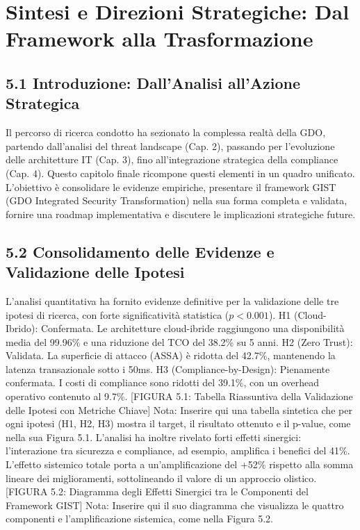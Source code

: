 \chapter{Sintesi e Direzioni Strategiche: Dal Framework alla Trasformazione}
\section{5.1 Introduzione: Dall'Analisi all'Azione Strategica}

Il percorso di ricerca condotto ha sezionato la complessa realtà della GDO, partendo dall'analisi del threat landscape (Cap. 2), passando per l'evoluzione delle architetture IT (Cap. 3), fino all'integrazione strategica della compliance (Cap. 4). Questo capitolo finale ricompone questi elementi in un quadro unificato. L'obiettivo è consolidare le evidenze empiriche, presentare il framework GIST (GDO Integrated Security Transformation) nella sua forma completa e validata, fornire una roadmap implementativa e discutere le implicazioni strategiche future.

\section{5.2 Consolidamento delle Evidenze e Validazione delle Ipotesi}

L'analisi quantitativa ha fornito evidenze definitive per la validazione delle tre ipotesi di ricerca, con forte significatività statistica ($p<0.001$).
H1 (Cloud-Ibrido): Confermata. Le architetture cloud-ibride raggiungono una disponibilità media del 99.96\% e una riduzione del TCO del 38.2\% su 5 anni.
H2 (Zero Trust): Validata. La superficie di attacco (ASSA) è ridotta del 42.7\%, mantenendo la latenza transazionale sotto i 50ms.
H3 (Compliance-by-Design): Pienamente confermata. I costi di compliance sono ridotti del 39.1\%, con un overhead operativo contenuto al 9.7\%.
[FIGURA 5.1: Tabella Riassuntiva della Validazione delle Ipotesi con Metriche Chiave]
Nota: Inserire qui una tabella sintetica che per ogni ipotesi (H1, H2, H3) mostra il target, il risultato ottenuto e il p-value, come nella sua Figura 5.1.
L'analisi ha inoltre rivelato forti effetti sinergici: l'interazione tra sicurezza e compliance, ad esempio, amplifica i benefici del 41\%. L'effetto sistemico totale porta a un'amplificazione del +52\% rispetto alla somma lineare dei miglioramenti, sottolineando il valore di un approccio olistico.
[FIGURA 5.2: Diagramma degli Effetti Sinergici tra le Componenti del Framework GIST]
Nota: Inserire qui il suo diagramma che visualizza le quattro componenti e l'amplificazione sistemica, come nella Figura 5.2.

